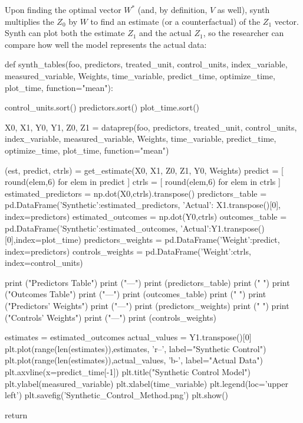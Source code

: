 \documentclass[11pt, a4paper, leqno]{article}
\begin{document}
Upon finding the optimal vector $W^*$ (and, by definition, $V$ as well), synth multiplies the $Z_0$ by $W$ to find an estimate (or a counterfactual) of the $Z_1$ vector. Synth can plot both the estimate $Z_1$ and the actual $Z_1$, so the researcher can compare how well the model represents the actual data:\\

\begin{python}
def synth_tables(foo, 
                 predictors, 
                 treated_unit, 
                 control_units, 
                 index_variable, 
                 measured_variable,
                 Weights,
                 time_variable,
                 predict_time, 
                 optimize_time, 
                 plot_time,
                 function="mean"):

    control_units.sort()
    predictors.sort()
    plot_time.sort()

    X0, X1, Y0, Y1, Z0, Z1 = dataprep(foo, 
                 predictors, 
                 treated_unit, 
                 control_units, 
                 index_variable, 
                 measured_variable,
                 Weights,
                 time_variable,
                 predict_time, 
                 optimize_time, 
                 plot_time, 
                 function="mean")

    (est, predict, ctrls) = get_estimate(X0, X1, Z0, Z1, Y0, Weights)
    predict = [ round(elem,6) for elem in predict ]
    ctrls = [ round(elem,6) for elem in ctrls ]
    estimated_predictors = np.dot(X0,ctrls).transpose()
    predictors_table = pd.DataFrame({'Synthetic':estimated_predictors, 
                       'Actual': X1.transpose()[0]}, index=predictors)
    estimated_outcomes = np.dot(Y0,ctrls)
    outcomes_table = pd.DataFrame({'Synthetic':estimated_outcomes, 
                    'Actual':Y1.transpose()[0]},index=plot_time)
    predictors_weights = pd.DataFrame({'Weight':predict}, index=predictors)
    controls_weights = pd.DataFrame({'Weight':ctrls}, index=control_units)

    print ("Predictors Table")
    print ("---")
    print (predictors_table)
    print (" ")
    print ("Outcomes Table")
    print ("---")
    print (outcomes_table)
    print (" ")
    print ("Predictors' Weights")
    print ("---")
    print (predictors_weights)
    print (" ")
    print ("Controls' Weights")
    print ("---")
    print (controls_weights)

    estimates = estimated_outcomes
    actual_values = Y1.transpose()[0]
    plt.plot(range(len(estimates)),estimates, 'r--', 
        label="Synthetic Control")
    plt.plot(range(len(estimates)),actual_values, 'b-', 
        label="Actual Data")
    plt.axvline(x=predict_time[-1])
    plt.title("Synthetic Control Model")
    plt.ylabel(measured_variable)
    plt.xlabel(time_variable)
    plt.legend(loc='upper left')
    plt.savefig('Synthetic_Control_Method.png')
    plt.show()
    
    return
\end{python}
\end{document}
